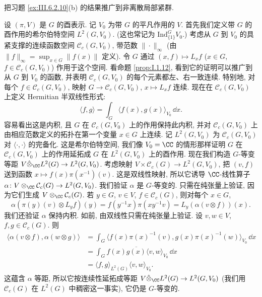 \begin{exercise}[非离散群的情形]
\label{ex:III.6.2.11}
把习题 \ref{ex:III.6.2.10}(b) 的结果推广到非离散局部紧群.
\end{exercise}

\begin{solution}
设 $(\pi, V)$ 是 $G$ 的酉表示. 记 $V_0$ 为带 $G$ 的平凡作用的 $V$.
首先我们定义带 $G$ 的酉作用的希尔伯特空间 $L^2(G, V_0)$. (这也常记为 $\mathrm{Ind}^G_{\{1\}}V_0$.) 考虑从 $G$ 到 $V_0$ 的具紧支撑的连续函数空间 $\mathcal{C}_c(G, V_0)$, 带范数 $\|\cdot\|_{\infty}$ (由 $\|f\|_{\infty} = \sup_{x \in G}\|f(x)\|$ 定义). 令 $G$ 通过 $(x, f) \longmapsto L_xf$ ($x \in G$, $f \in \mathcal{C}_c(G, V_0)$) 作用于这个空间. 看命题 \ref{prop:I.1.12}, 看到它的证明可以推广到从 $G$ 到 $V_0$ 的函数, 并表明 $\mathcal{C}_c(G, V_0)$ 的每个元素都左、右一致连续. 特别地, 对每个 $f \in \mathcal{C}_c(G, V_0)$, 映射 $G \to \mathcal{C}_c(G, V_0)$, $x \longmapsto L_xf$ 连续.
现在在 $\mathcal{C}_c(G, V_0)$ 上定义 Hermitian 半双线性形式:
\[
\langle f, g \rangle = \int_G \langle f(x), g(x) \rangle_{V_0}\,\dd x.
\]
容易看出这是内积, 且 $G$ 在 $\mathcal{C}_c(G, V_0)$ 上的作用保持此内积, 并对 $\mathcal{C}_c(G, V_0)$ 上由相应范数定义的拓扑在第一个变量 $x \in G$ 上连续. 记 $L^2(G, V_0)$ 为 $\mathcal{C}_c(G, V_0)$ 对 $\langle \cdot, \cdot \rangle$ 的完备化. 这是希尔伯特空间, 我们像 $V_0 = \CC$ 的情形那样证明 $G$ 在 $\mathcal{C}_c(G, V_0)$ 上的作用延拓成 $G$ 在 $L^2(G, V_0)$ 上的酉作用.
现在我们构造 $G$-等变等距 $V \hat{\otimes}_{\CC}L^2(G) \to L^2(G, V_0)$. 考虑映射 $V \times \mathcal{C}_c(G) \to L^2(G, V_0)$, 把 $(v, f)$ 送到函数 $x \longmapsto f(x)\pi(x^{-1})(v)$. 这是双线性映射, 所以它诱导 $\CC$-线性算子 $\alpha \colon V \otimes_{\CC}\mathcal{C}_c(G) \to L^2(G, V_0)$. 我们验证 $\alpha$ 是 $G$-等变的. 只需在纯张量上验证, 因为它们生成 $V \otimes_{\CC}\mathcal{C}_c(G)$. 若 $y \in G$, $v \in V$, $f \in \mathcal{C}_c(G)$, 则对每个 $x \in G$,
\[
\alpha(\pi(y)(v) \otimes L_yf)(y) = f(y^{-1}x)\pi(xy^{-1}v) = L_y(\alpha(v \otimes f))(x).
\]
我们还验证 $\alpha$ 保持内积. 如前, 由双线性只需在纯张量上验证. 设 $v, w \in V$, $f, g \in \mathcal{C}_c(G)$. 则
\begin{align*}
\langle \alpha(v \otimes f), \alpha(w \otimes g) \rangle &= \int_G \langle f(x)\pi(x)^{-1}(v), g(x)\pi(x)^{-1}(w) \rangle_{V_0}\,\dd x \\
&= \int_G f(x)\overline{g(x)}\langle v, w \rangle_{V_0}\,\dd x \\
&= \langle f, g \rangle_{L^2(G)}\langle v, w \rangle_{V_0}.
\end{align*}
这蕴含 $\alpha$ 等距, 所以它按连续性延拓成等距 $V \hat{\otimes}_{\CC}L^2(G) \to L^2(G, V_0)$ (我们用 $\mathcal{C}_c(G)$ 在 $L^2(G)$ 中稠密这一事实), 它仍是 $G$-等变的.

\end{solution}
